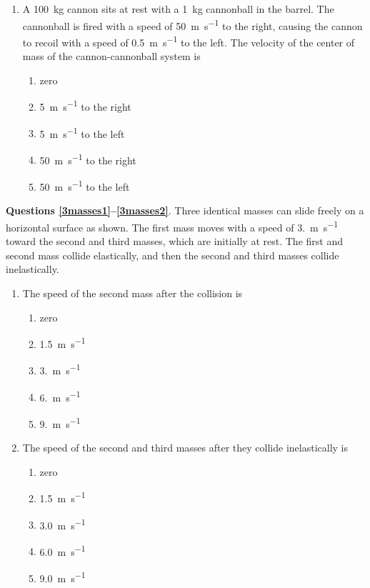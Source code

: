 \documentclass{../../oss-apphys}
\begin{document}
\begin{multicols}{2}
\begin{enumerate}[leftmargin=18pt,resume]
  \item A \SI{100}{\kilo\gram} cannon sits at rest with a \SI{1}{\kilo\gram}
    cannonball in the barrel. The cannonball is fired with a speed of
    \SI{50}{\metre\per\second} to the right, causing the cannon to recoil with
    a speed of \SI{.5}{\metre\per\second} to the left. The velocity of the
    center of mass of the cannon-cannonball system is
    \begin{enumerate}[noitemsep,topsep=0pt,leftmargin=18pt,label=(\Alph*)]
    \item zero
    \item\SI{5}{\metre\per\second} to the right
    \item\SI{5}{\metre\per\second} to the left
    \item\SI{50}{\metre\per\second} to the right
    \item\SI{50}{\metre\per\second} to the left
    \end{enumerate}
  \end{enumerate}
  \columnbreak
  
  \textbf{Questions \ref{3masses1}--\ref{3masses2}}. Three identical masses can
  slide freely on a horizontal surface as shown. The first mass moves with a
  speed of \SI{3.}{\metre\per\second} toward the second and third masses, which
  are initially at rest. The first and second mass collide elastically, and
  then the second and third masses collide inelastically.
  \begin{center}
  \end{center}
  \begin{enumerate}[leftmargin=18pt,resume]
  \item The speed of the second mass after the collision is
    \label{3masses1}
    \begin{enumerate}[noitemsep,topsep=0pt,leftmargin=18pt,label=(\Alph*)]
    \item zero
    \item\SI{1.5}{\metre\per\second}
    \item\SI{3.}{\metre\per\second}
    \item\SI{6.}{\metre\per\second}
    \item\SI{9.}{\metre\per\second}
    \end{enumerate}

  \item The speed of the second and third masses after they collide
    inelastically is
    \label{3masses2}
    \begin{enumerate}[noitemsep,topsep=0pt,leftmargin=18pt,label=(\Alph*)]
    \item zero
    \item\SI{1.5}{\metre\per\second}
    \item\SI{3.0}{\metre\per\second}
    \item\SI{6.0}{\metre\per\second}
    \item\SI{9.0}{\metre\per\second}
    \end{enumerate}
  \end{enumerate}
  

\end{multicols}
\end{document}
